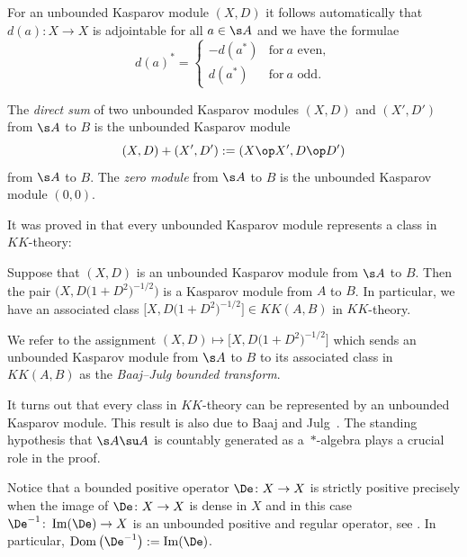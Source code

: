 For an unbounded Kasparov module $(X,D)$ it follows automatically that $d(a)\colon X \to X$ is adjointable for all $a \in \s A$ and we have the formulae
\[
d(a)^* = \begin{cases} - d(a^*) & \text{for} \ a \text{ even}, \\ d(a^*) & \text{for} \ a \text{ odd}.\end{cases}
\]

\begin{dfn}\label{d:dirsum}
The \emph{direct sum} of two unbounded Kasparov modules $(X,D)$ and $(X', D')$ from $\s A$ to $B$ is the unbounded Kasparov module
\[
(X, D) + (X', D') := (X \op X', D \op D')
\]
from $\s A$ to $B$. The \emph{zero module} from $\s A$ to $B$ is the unbounded Kasparov module $(0,0)$.
\end{dfn}


It was proved in \cite{BaJu:TBK} that every unbounded Kasparov module represents a class in $KK$-theory:

\begin{Theorem}
Suppose that $(X,D)$ is an unbounded Kasparov module from $\s A$ to $B$. Then the pair $\big(X, D\big(1 + D^2\big)^{-1/2}\big)$ is a Kasparov module from $A$ to $B$. In particular, we have an associated class $\big[X, D\big(1 + D^2\big)^{-1/2}\big] \in KK(A,B)$ in $KK$-theory.
\end{Theorem}

We refer to the assignment $(X,D) \mapsto \big[ X, D\big(1 + D^2\big)^{-1/2}\big]$ which sends an unbounded Kasparov module from $\s A$ to $B$ to its associated class in $KK(A,B)$ as the \emph{Baaj--Julg bounded transform}.

It turns out that every class in $KK$-theory can be represented by an unbounded Kasparov module. This result is also due to Baaj and Julg~\cite{BaJu:TBK}. The standing hypothesis that $\s A \su A$ is countably generated as a~$*$-algebra plays a crucial role in the proof.

Notice that a bounded positive operator $\De\colon X \to X$ is strictly positive precisely when the image of $\De\colon X \to X$ is dense in $X$ and in this case $\De^{-1}\colon \operatorname{Im}(\De) \to X$ is an unbounded positive and regular operator, see \cite[Lemma~10.1]{Lan:HCM}. In particular, $\operatorname{Dom}\big(\De^{-1}\big) := \operatorname{Im}(\De)$.

